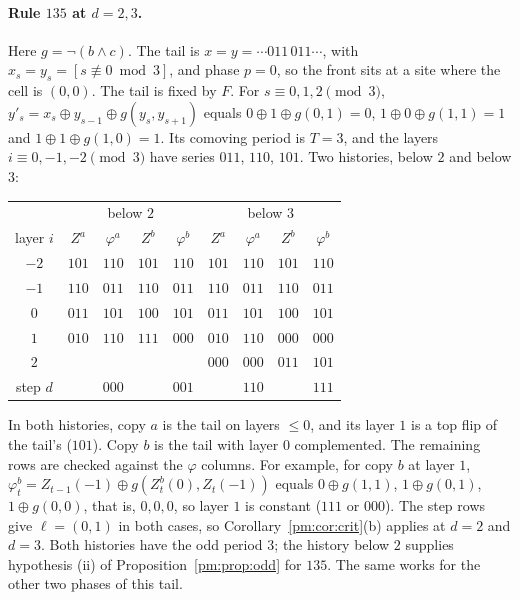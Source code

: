\paragraph{Rule $135$ at $d=2,3$.} Here $g=\neg(b\wedge c)$. The tail is $x=y=\cdots011\,011\cdots$, with $x_s=y_s=[s\not\equiv0\bmod3]$, and phase $p=0$, so the front sits at a site where the cell is $(0,0)$. The tail is fixed by $F$. For $s\equiv0,1,2\pmod 3$, $y'_s=x_s\oplus y_{s-1}\oplus g(y_s,y_{s+1})$ equals $0\oplus1\oplus g(0,1)=0$, $1\oplus0\oplus g(1,1)=1$ and $1\oplus1\oplus g(1,0)=1$. Its comoving period is $T=3$, and the layers $i\equiv0,-1,-2\pmod3$ have series $011$, $110$, $101$. Two histories, below $2$ and below $3$:
\begin{center}
\begin{tabular}{c|cccc|cccc}
\toprule
& \multicolumn{4}{c|}{below $2$} & \multicolumn{4}{c}{below $3$}\\
layer $i$ & $Z^a$ & $\varphi^a$ & $Z^b$ & $\varphi^b$ & $Z^a$ & $\varphi^a$ & $Z^b$ & $\varphi^b$\\
\midrule
$-2$ & $101$ & $110$ & $101$ & $110$ & $101$ & $110$ & $101$ & $110$\\
$-1$ & $110$ & $011$ & $110$ & $011$ & $110$ & $011$ & $110$ & $011$\\
$0$ & $011$ & $101$ & $100$ & $101$ & $011$ & $101$ & $100$ & $101$\\
$1$ & $010$ & $110$ & $111$ & $000$ & $010$ & $110$ & $000$ & $000$\\
$2$ & & & & & $000$ & $000$ & $011$ & $101$\\
\midrule
step $d$ & & $000$ & & $001$ & & $110$ & & $111$\\
\bottomrule
\end{tabular}
\end{center}
In both histories, copy $a$ is the tail on layers $\le0$, and its layer $1$ is a top flip of the tail's ($101$). Copy $b$ is the tail with layer $0$ complemented. The remaining rows are checked against the $\varphi$ columns. For example, for copy $b$ at layer $1$, $\varphi^b_t=Z_{t-1}(-1)\oplus g(Z^b_t(0),Z_t(-1))$ equals $0\oplus g(1,1)$, $1\oplus g(0,1)$, $1\oplus g(0,0)$, that is, $0,0,0$, so layer $1$ is constant ($111$ or $000$). The step rows give $\ell=(0,1)$ in both cases, so Corollary~\ref{pm:cor:crit}(b) applies at $d=2$ and $d=3$. Both histories have the odd period $3$; the history below $2$ supplies hypothesis (ii) of Proposition~\ref{pm:prop:odd} for $135$. The same works for the other two phases of this tail.

